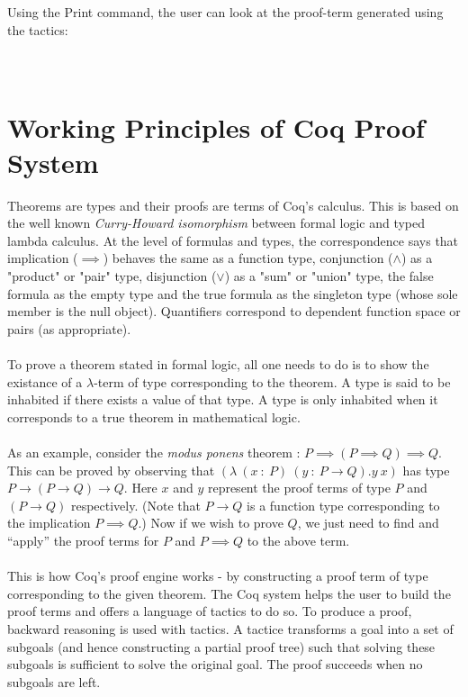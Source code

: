 \noindent
Using the Print command, the user can look at the proof-term generated using the tactics: \\\\\\


\section{Working Principles of Coq Proof System}
Theorems are types and their proofs are terms of Coq's calculus. This is based on the well known \emph{Curry-Howard isomorphism} between formal logic and typed lambda calculus. At the level of formulas and types, the correspondence says that implication ($\implies$) behaves the same as a function type, conjunction ($\wedge$) as a "product" or "pair" type, disjunction ($\vee$) as a "sum" or "union" type, the false formula as the empty type and the true formula as the singleton type (whose sole member is the null object). Quantifiers correspond to dependent function space or pairs (as appropriate). \\\\
To prove a theorem stated in formal logic, all one needs to do is to show the existance of a $\lambda$-term of type corresponding to the theorem. A type is said to be inhabited if there exists a value of that type. A type is only inhabited when it corresponds to a true theorem in mathematical logic. \\\\
As an example, consider the \emph{modus ponens} theorem : $P \implies (P \implies Q) \implies Q$. This can be proved by observing that $(\lambda\: (x\: :\: P)\: (y\: :\: P \rightarrow Q).y\: x)$ has type $P \rightarrow (P \rightarrow Q) \rightarrow Q$. Here $x$ and $y$ represent the proof terms of type $P$ and $(P \rightarrow Q)$ respectively. (Note that $P \rightarrow Q$ is a function type corresponding to the implication $P \implies Q$.) Now if we wish to prove $Q$, we just need to find and ``apply'' the proof terms for $P$ and $P \implies Q$ to the above term. \\\\
This is how Coq's proof engine works - by constructing a proof term of type corresponding to the given theorem. The Coq system helps the user to build the proof terms and offers a language of tactics to do so. To produce a proof, backward reasoning is used with tactics. A tactice transforms a goal into a set of subgoals (and hence constructing a partial proof tree) such that solving these subgoals is sufficient to solve the original goal. The proof succeeds when no subgoals are left.